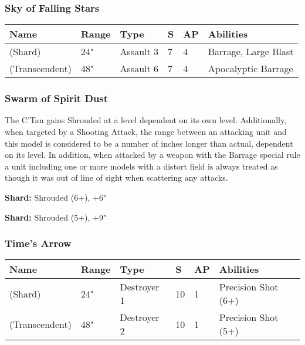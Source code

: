 \subsubsection{Sky of Falling Stars} \label{Sky of Falling Stars}

\noindent
\begin{tabular}{||m{160pt} m{31pt} m{55pt} m{12pt} m{12pt} m{200pt}||}
	\hline
	Name & Range & Type & S & AP & Abilities \\
	\hline
	\quickref{Sky of Falling Stars} (Shard) & 24" & Assault 3 & 7 & 4 & Barrage, Large Blast \\
	\quickref{Sky of Falling Stars} (Transcendent) & 48" & Assault 6 & 7 & 4 & Apocalyptic Barrage \\
	\hline
\end{tabular}

\subsubsection{Swarm of Spirit Dust} \label{Swarm of Spirit Dust}

The C'Tan gains Shrouded at a level dependent on its own level. Additionally, when targeted by a Shooting Attack, the range between an attacking unit and this model is considered to be a number of inches longer than actual, dependent on its level. In addition, when attacked by a weapon with the Barrage special rule a unit including one or more models with a distort field is always treated as though it was out of line of sight when scattering any attacks.

\textbf{Shard:} Shrouded (6+), +6"

\textbf{Shard:} Shrouded (5+), +9"

\subsubsection{Time's Arrow} \label{Time's Arrow}

\noindent
\begin{tabular}{||m{160pt} m{31pt} m{55pt} m{12pt} m{12pt} m{200pt}||}
	\hline
	Name & Range & Type & S & AP & Abilities \\
	\hline
	\quickref{Time's Arrow} (Shard) & 24" & Destroyer 1 & 10 & 1 & Precision Shot (6+) \\
	\quickref{Time's Arrow} (Transcendent) & 48" & Destroyer 2 & 10 & 1 & Precision Shot (5+) \\
	\hline
\end{tabular}

